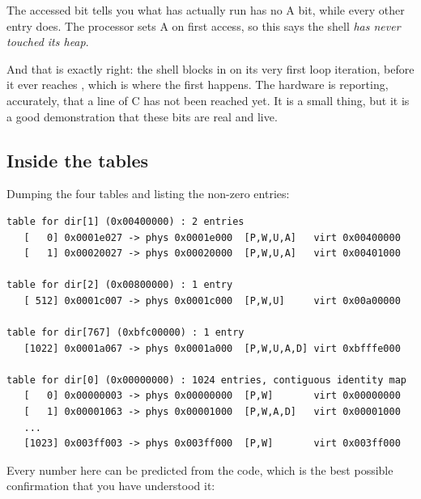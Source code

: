 \begin{warn}{The accessed bit tells you what has actually run}
 has no A bit, while every other entry does. The processor sets A on first access, so
this says the shell \emph{has never touched its heap}.

And that is exactly right: the shell blocks in  on its very first loop iteration, before
it ever reaches , which is where the first  happens. The hardware is
reporting, accurately, that a line of C has not been reached yet. It is a small thing, but it is a
good demonstration that these bits are real and live.
\end{warn}

\subsection{Inside the tables}

Dumping the four tables and listing the non-zero entries:

\begin{lstlisting}[style=txt]
table for dir[1] (0x00400000) : 2 entries
   [   0] 0x0001e027 -> phys 0x0001e000  [P,W,U,A]   virt 0x00400000
   [   1] 0x00020027 -> phys 0x00020000  [P,W,U,A]   virt 0x00401000

table for dir[2] (0x00800000) : 1 entry
   [ 512] 0x0001c007 -> phys 0x0001c000  [P,W,U]     virt 0x00a00000

table for dir[767] (0xbfc00000) : 1 entry
   [1022] 0x0001a067 -> phys 0x0001a000  [P,W,U,A,D] virt 0xbfffe000

table for dir[0] (0x00000000) : 1024 entries, contiguous identity map
   [   0] 0x00000003 -> phys 0x00000000  [P,W]       virt 0x00000000
   [   1] 0x00001063 -> phys 0x00001000  [P,W,A,D]   virt 0x00001000
   ...
   [1023] 0x003ff003 -> phys 0x003ff000  [P,W]       virt 0x003ff000
\end{lstlisting}

Every number here can be predicted from the code, which is the best possible confirmation that you
have understood it:

